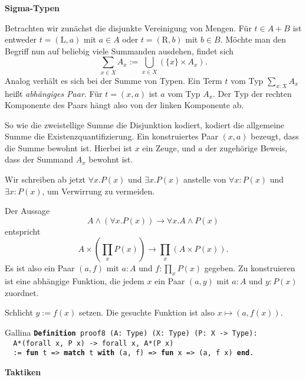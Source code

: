 \documentclass[8pt]{beamer}
\newcommand{\strong}[1]{\textsf{\textbf{#1}}}
\newcommand{\centerheadline}[1]{%
  \begin{center}\strong{#1}\end{center}}
\newcommand{\parspace}{\vspace{0.8em}}
\newcommand{\cond}{\rightarrow}
\newcommand{\kw}[1]{\textbf{#1}}
\begin{document}
\begin{frame}[t]
\strong{Sigma-Typen}

\vspace{3em}
Betrachten wir zunächst die disjunkte Vereinigung von Mengen.
Für $t\in A+B$ ist entweder $t=(\mathrm L,a)$ mit $a\in A$ oder
$t=(\mathrm R,b)$ mit $b\in B$. Möchte man den Begriff nun auf
beliebig viele Summanden ausdehen, findet sich
\[\sum_{x\in X} A_x := \bigcup_{x\in X} (\{x\}\times A_x).\]\pause
Analog verhält es sich bei der Summe von Typen. Ein Term $t$ vom
Typ $\sum_{x\colon X} A_x$ heißt \emph{abhängiges Paar}.
Für $t=(x,a)$ ist $a$ vom Typ $A_x$. Der Typ der rechten Komponente
des Paars hängt also von der linken Komponente ab.\pause

\parspace
So wie die zweistellige Summe die Disjunktion kodiert, kodiert
die allgemeine Summe die Existenzquantifizierung. Ein konstruiertes
Paar $(x,a)$ bezeugt, dass die Summe bewohnt ist. Hierbei ist
$x$ ein Zeuge, und $a$ der zugehörige Beweis, dass der Summand
$A_x$ bewohnt ist.
\end{frame}

\begin{frame}
Wir schreiben ab jetzt $\forall x.P(x)$ und $\exists x.P(x)$ anstelle
von $\forall x\colon P(x)$ und $\exists x\colon P(x)$, um Verwirrung
zu vermeiden.

\parspace
Der Aussage
\[A\land(\forall x. P(x))\cond\forall x.A\land P(x)\]
entspricht
\[A\times(\prod_x P(x))\to\prod_x (A\times P(x)).\]
Es ist also ein Paar $(a,f)$ mit $a\colon A$ und $f\colon\prod_x P(x)$
gegeben. Zu konstruieren ist eine abhängige Funktion, die jedem
$x$ ein Paar $(a,y)$ mit $a\colon A$ und $y\colon P(x)$ zuordnet.\pause

\parspace
Schlicht $y:=f(x)$ setzen. Die gesuchte Funktion ist also $x\mapsto (a,f(x))$.
\begin{block}{Gallina}
\texttt{\kw{Definition} proof8 (A: Type) (X: Type) (P: X -> Type):\\
\ \ A*(forall x, P x) -> forall x, A*(P x)\\
\ \ := \kw{fun} t => \kw{match} t \kw{with} (a, f) => \kw{fun} x => (a, f x) \kw{end}.}
\end{block}
\end{frame}

\begin{frame}
\centerheadline{Taktiken}
\end{frame}
\end{document}
